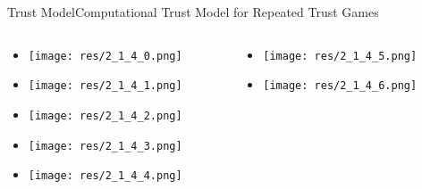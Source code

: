 \begin{frame}{Trust Model}{Computational Trust Model for Repeated Trust Games \cite{dang_computational_2016}}

		\begin{columns}[T]
			\begin{column}{0.4\textwidth}
				\begin{flushleft}
				
					\begin{itemize}
						\item[] \texttt{[image: res/2\_1\_4\_0.png]}
						\item[] \texttt{[image: res/2\_1\_4\_1.png]}
						\item[] \texttt{[image: res/2\_1\_4\_2.png]}
						\item[] \texttt{[image: res/2\_1\_4\_3.png]}
						\item[] \texttt{[image: res/2\_1\_4\_4.png]}
					\end{itemize}
				
				\end{flushleft}
			\end{column}
			
			\begin{column}{0.4\textwidth}
				\begin{center}
				
					\begin{itemize}
						\item[] \texttt{[image: res/2\_1\_4\_5.png]}
						\item[] \texttt{[image: res/2\_1\_4\_6.png]}
					\end{itemize}
					
				\end{center}
			\end{column}
		\end{columns}
		
\end{frame}

